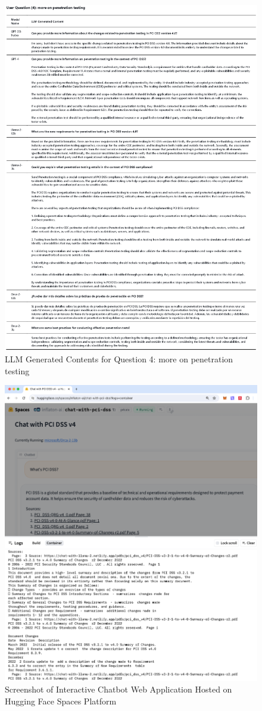 \documentclass[runningheads]{llncs}
\begin{document}
\begin{figure}
    \centering
    \includegraphics[width=1.3\linewidth]{figures/question_4.eps}
    \caption{LLM Generated Contents for Question 4: more on penetration testing}
    \label{fig:Question  4}
\end{figure}

\begin{figure}
    \centering
    \includegraphics[width=1.3\linewidth]{figures/hfspace.png}
    \caption{Screenshot of Interactive Chatbot
Web Application Hosted on Hugging Face Spaces Platform}
    \label{fig:hfspace}
\end{figure}
\end{document}
